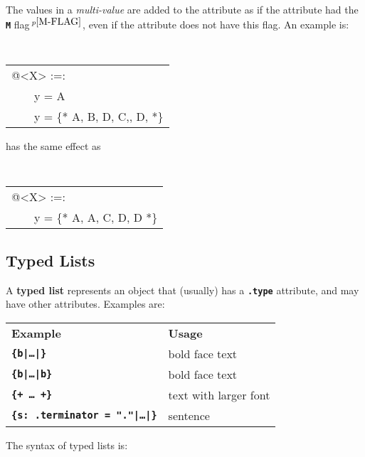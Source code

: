 \documentclass[12pt]{article}
\newcommand{\TT}[1]{{\tt \bfseries #1}}
\newcommand{\key}[1]{{\rm \bfseries #1}}
\newcommand{\pagnote}[1]{$\,^{p\pageref{#1}}$}
\newenvironment{indpar}[1][0.3in]%
	{\begin{list}{}%
		     {\setlength{\itemsep}{0in}%
		      \setlength{\topsep}{0in}%
		      \setlength{\parsep}{1ex}%
		      \setlength{\labelwidth}{#1}%
		      \setlength{\leftmargin}{#1}%
		      \addtolength{\leftmargin}{\labelsep}}%
	 \item}%
	{\end{list}}
\begin{document}
The values in a {\em multi-value} are added to the attribute
as if the attribute had the \TT{M} flag\pagnote{M-FLAG}, even if
the attribute does not have this flag.  An example is:
\begin{indpar}
\tt
\begin{tabular}{l}
@<X> :=: \\
~~~~y = A \\
~~~~y = \{* A, B, D, C,, D, *\} \\
\end{tabular}
\end{indpar}
has the same effect as
\begin{indpar}
\tt
\begin{tabular}{l}
@<X> :=: \\
~~~~y = \{* A, A, C, D, D *\} \\
\end{tabular}
\end{indpar}

\subsection{Typed Lists}
\label{TYPED-LISTS}

A \key{typed list} represents an object that (usually) has a
\TT{.type} attribute, and may have other attributes.  Examples are:
\begin{center}
    \begin{tabular}[t]{l@{~~~~~}l}
     \bf Example & \bf Usage
     \\[1ex]
    \TT{\{b|\ldots|\}} & bold face text
    \\
    \TT{\{b|\ldots|b\}} & bold face text
    \\
    \TT{\{+ \ldots{}~+\}} & text with larger font
    \\
    \TT{\{s:~.terminator = "."|\ldots|\}} & sentence
    \\
    \end{tabular}
\end{center}

The syntax of typed lists is:
\end{document}

